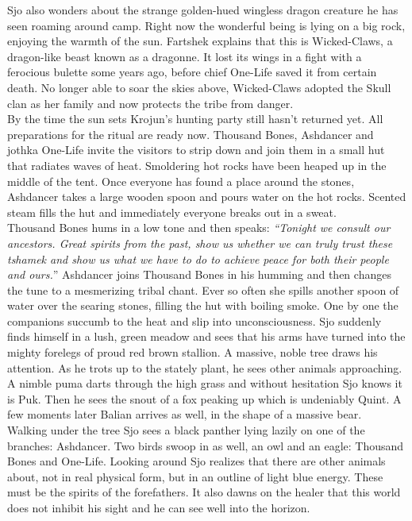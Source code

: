 Sjo also wonders about the strange golden-hued wingless dragon creature he has seen roaming around camp. Right now the wonderful being is lying on a big rock, enjoying the warmth of the sun. Fartshek explains that this is Wicked-Claws, a dragon-like beast known as a dragonne. It lost its wings in a fight with a ferocious bulette some years ago, before chief One-Life saved it from certain death. No longer able to soar the skies above, Wicked-Claws adopted the Skull clan as her family and now protects the tribe from danger.\\

By the time the sun sets Krojun's hunting party still hasn't returned yet. All preparations for the ritual are ready now. Thousand Bones, Ashdancer and jothka One-Life invite the visitors to strip down and join them in a small hut that radiates waves of heat. Smoldering hot rocks have been heaped up in the middle of the tent. Once everyone has found a place around the stones, Ashdancer takes a large wooden spoon and pours water on the hot rocks. Scented steam fills the hut and immediately everyone breaks out in a sweat.\\

Thousand Bones hums in a low tone and then speaks: {\itshape``Tonight we consult our ancestors. Great spirits from the past, show us whether we can truly trust these {\itshape tshamek} and show us what we have to do to achieve peace for both their people and ours.}'' Ashdancer joins Thousand Bones in his humming and then changes the tune to a mesmerizing tribal chant. Ever so often she spills another spoon of water over the searing stones, filling the hut with boiling smoke. One by one the companions succumb to the heat and slip into unconsciousness. Sjo suddenly finds himself in a lush, green meadow and sees that his arms have turned into the mighty forelegs of proud red brown stallion. A massive, noble tree draws his attention. As he trots up to the stately plant, he sees other animals approaching. A nimble puma darts through the high grass and without hesitation Sjo knows it is Puk. Then he sees the snout of a fox peaking up which is undeniably Quint. A few moments later Balian arrives as well, in the shape of a massive bear.\\

Walking under the tree Sjo sees a black panther lying lazily on one of the branches: Ashdancer. Two birds swoop in as well, an owl and an eagle: Thousand Bones and One-Life. Looking around Sjo realizes that there are other animals about, not in real physical form, but in an outline of light blue energy. These must be the spirits of the forefathers. It also dawns on the healer that this world does not inhibit his sight and he can see well into the horizon.\\

